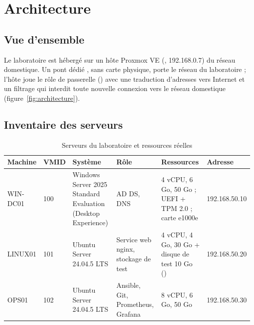 \chapter{Architecture}\label{chap:architecture}

\section{Vue d'ensemble}

Le laboratoire est hébergé sur un hôte Proxmox VE (, 192.168.0.7) du réseau
domestique. Un pont dédié , sans carte physique, porte le réseau du laboratoire
 ; l'hôte joue le rôle de passerelle () avec une
traduction d'adresses vers Internet et un filtrage qui interdit toute nouvelle connexion vers le
réseau domestique (figure~\ref{fig:architecture}).


\section{Inventaire des serveurs}

\begin{table}[H]
\centering
\caption{Serveurs du laboratoire et ressources réelles}\label{tab:inventaire}
\begin{tabularx}{\linewidth}{@{}P{2cm}P{1.1cm}P{3.6cm}P{2.6cm}LP{2.1cm}@{}}
\toprule
\textbf{Machine} & \textbf{VMID} & \textbf{Système} & \textbf{Rôle} & \textbf{Ressources} & \textbf{Adresse} \\
\midrule
WIN-DC01 & 100 & Windows Server 2025 Standard Evaluation (Desktop Experience) & AD DS, DNS & 4 vCPU, 6 Go, 50 Go ; UEFI + TPM 2.0 ; carte e1000e & 192.168.50.10 \\
LINUX01 & 101 & Ubuntu Server 24.04.5 LTS & Service web nginx, stockage de test & 4 vCPU, 4 Go, 30 Go + disque de test 10 Go () & 192.168.50.20 \\
OPS01 & 102 & Ubuntu Server 24.04.5 LTS & Ansible, Git, Prometheus, Grafana & 8 vCPU, 6 Go, 50 Go & 192.168.50.30 \\
\bottomrule
\end{tabularx}
\end{table}

